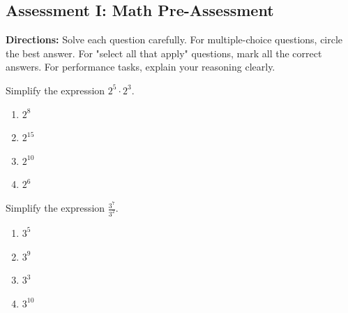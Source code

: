 \documentclass[12pt]{article}
\begin{document}
\subsection*{Assessment I: Math Pre-Assessment}
\onehalfspacing

\begin{tcolorbox}[colframe=black!50, colback=white, title=Assessment Directions]
\textbf{Directions:} Solve each question carefully. For multiple-choice questions, circle the best answer. For "select all that apply" questions, mark all the correct answers. For performance tasks, explain your reasoning clearly.
\end{tcolorbox}

\begin{tcolorbox}[colframe=black!50, colback=white, title=\textbf{Problem 1 (8.EE.A.1)}]
Simplify the expression \(2^5 \cdot 2^3\).

\begin{enumerate}[label=(\Alph*)]
    \item \(2^8\)
    \item \(2^{15}\)
    \item \(2^{10}\)
    \item \(2^6\)
\end{enumerate}
\end{tcolorbox}

\begin{tcolorbox}[colframe=black!50, colback=white, title=\textbf{Problem 2 (8.EE.A.1)}]
Simplify the expression \(\frac{3^7}{3^2}\).

\begin{enumerate}[label=(\Alph*)]
    \item \(3^5\)
    \item \(3^9\)
    \item \(3^3\)
    \item \(3^{10}\)
\end{enumerate}
\end{tcolorbox}
\end{document}
